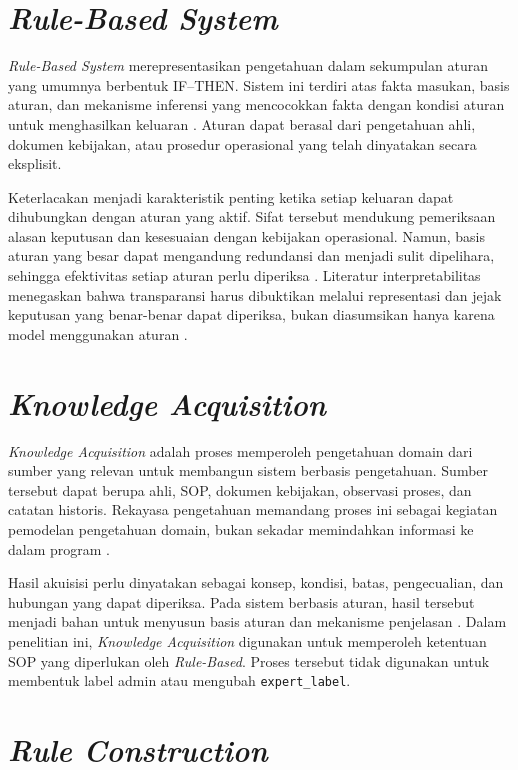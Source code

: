 \section{\textit{Rule-Based System}}

\textit{Rule-Based System} merepresentasikan pengetahuan dalam sekumpulan aturan yang umumnya berbentuk IF--THEN. Sistem ini terdiri atas fakta masukan, basis aturan, dan mekanisme inferensi yang mencocokkan fakta dengan kondisi aturan untuk menghasilkan keluaran \cite{BuchananShortliffe1984,LiuEtAl2016RuleBased}. Aturan dapat berasal dari pengetahuan ahli, dokumen kebijakan, atau prosedur operasional yang telah dinyatakan secara eksplisit.

Keterlacakan menjadi karakteristik penting ketika setiap keluaran dapat dihubungkan dengan aturan yang aktif. Sifat tersebut mendukung pemeriksaan alasan keputusan dan kesesuaian dengan kebijakan operasional. Namun, basis aturan yang besar dapat mengandung redundansi dan menjadi sulit dipelihara, sehingga efektivitas setiap aturan perlu diperiksa \cite{BenDavid2008}. Literatur interpretabilitas menegaskan bahwa transparansi harus dibuktikan melalui representasi dan jejak keputusan yang benar-benar dapat diperiksa, bukan diasumsikan hanya karena model menggunakan aturan \cite{Rudin2019,RudinEtAl2022}.

\section{\textit{Knowledge Acquisition}}

\textit{Knowledge Acquisition} adalah proses memperoleh pengetahuan domain dari sumber yang relevan untuk membangun sistem berbasis pengetahuan. Sumber tersebut dapat berupa ahli, SOP, dokumen kebijakan, observasi proses, dan catatan historis. Rekayasa pengetahuan memandang proses ini sebagai kegiatan pemodelan pengetahuan domain, bukan sekadar memindahkan informasi ke dalam program \cite{StuderEtAl1998}.

Hasil akuisisi perlu dinyatakan sebagai konsep, kondisi, batas, pengecualian, dan hubungan yang dapat diperiksa. Pada sistem berbasis aturan, hasil tersebut menjadi bahan untuk menyusun basis aturan dan mekanisme penjelasan \cite{BuchananShortliffe1984}. Dalam penelitian ini, \textit{Knowledge Acquisition} digunakan untuk memperoleh ketentuan SOP yang diperlukan oleh \textit{Rule-Based}. Proses tersebut tidak digunakan untuk membentuk label admin atau mengubah \texttt{expert\_label}.

\section{\textit{Rule Construction}}

